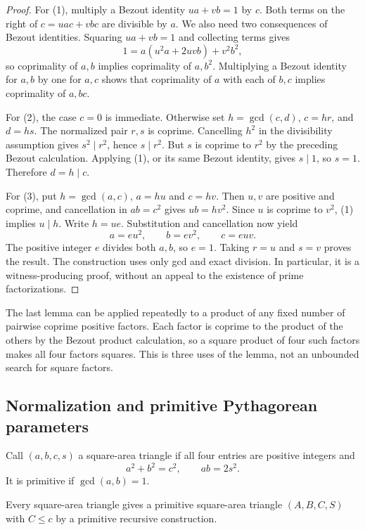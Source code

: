 \begin{proof}
For (1), multiply a Bezout identity $ua+vb=1$ by $c$.
Both terms on the right of $c=uac+vbc$ are divisible by $a$.
We also need two consequences of Bezout identities.  Squaring
$ua+vb=1$ and collecting terms gives
\[
 1=a(u^2a+2uvb)+v^2b^2,
\]
so coprimality of $a,b$ implies coprimality of $a,b^2$.
Multiplying a Bezout identity for $a,b$ by one for $a,c$ shows that
coprimality of $a$ with each of $b,c$ implies coprimality of $a,bc$.

For (2), the case $c=0$ is immediate.  Otherwise set
$h=\gcd(c,d)$, $c=hr$, and $d=hs$.  The normalized pair $r,s$ is
coprime.  Cancelling $h^2$ in the divisibility assumption gives
$s^2\mid r^2$, hence $s\mid r^2$.  But $s$ is coprime to $r^2$ by
the preceding Bezout calculation.  Applying (1), or its same Bezout
identity, gives $s\mid1$, so $s=1$.  Therefore $d=h\mid c$.

For (3), put $h=\gcd(a,c)$, $a=hu$ and $c=hv$.
Then $u,v$ are positive and coprime, and cancellation in $ab=c^2$
gives $ub=hv^2$.  Since $u$ is coprime to $v^2$, (1) implies
$u\mid h$.  Write $h=ue$.  Substitution and cancellation now yield
\[
 a=eu^2,\qquad b=ev^2,\qquad c=euv.
\]
The positive integer $e$ divides both $a,b$, so $e=1$.  Taking
$r=u$ and $s=v$ proves the result.  The construction uses only gcd
and exact division.  In particular, it is a witness-producing proof,
without an appeal to the existence of prime factorizations.
\end{proof}

The last lemma can be applied repeatedly to a product of any fixed number
of pairwise coprime positive factors.  Each factor is coprime to the
product of the others by the Bezout product calculation, so a square
product of four such factors makes all four factors squares.  This is
three uses of the lemma, not an unbounded search for square factors.

\subsection{Normalization and primitive Pythagorean parameters}

Call $(a,b,c,s)$ a square-area triangle if all four entries are positive
integers and
\[
 a^2+b^2=c^2,\qquad ab=2s^2.
 \tag{F2}\label{eq:fq-area}
\]
It is primitive if $\gcd(a,b)=1$.

\begin{lemma}\label{lem:fq-normalize}
Every square-area triangle gives a primitive square-area triangle
$(A,B,C,S)$ with $C\leq c$ by a primitive recursive construction.
\end{lemma}

